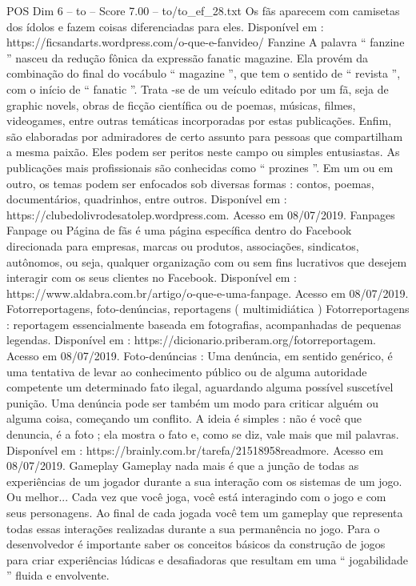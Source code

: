 \begin{textsample}{POS Dim 6 – to – Score 7.00 – to/to\_ef\_28.txt}
Os fãs aparecem com camisetas dos ídolos e fazem coisas diferenciadas para eles.
Disponível em : https://ficsandarts.wordpress.com/o-que-e-fanvideo/ Fanzine A palavra “ fanzine ” nasceu da redução fônica da expressão fanatic magazine.
Ela provém da combinação do final do vocábulo “ magazine ”, que tem o sentido de “ revista ”, com o início de “ fanatic ”.
Trata -se de um veículo editado por um fã, seja de graphic novels, obras de ficção científica ou de poemas, músicas, filmes, videogames, entre outras temáticas incorporadas por estas publicações.
Enfim, são elaboradas por admiradores de certo assunto para pessoas que compartilham a mesma paixão.
Eles podem ser peritos neste campo ou simples entusiastas.
As publicações mais profissionais são conhecidas como “ prozines ”.
Em um ou em outro, os temas podem ser enfocados sob diversas formas : contos, poemas, documentários, quadrinhos, entre outros.
Disponível em : https://clubedolivrodesatolep.wordpress.com.
Acesso em 08/07/2019.
Fanpages Fanpage ou Página de fãs é uma página específica dentro do Facebook direcionada para empresas, marcas ou produtos, associações, sindicatos, autônomos, ou seja, qualquer organização com ou sem fins lucrativos que desejem interagir com os seus clientes no Facebook.
Disponível em : https://www.aldabra.com.br/artigo/o-que-e-uma-fanpage.
Acesso em 08/07/2019.
Fotorreportagens, foto-denúncias, reportagens ( multimidiática ) Fotorreportagens : reportagem essencialmente baseada em fotografias, acompanhadas de pequenas legendas.
Disponível em : https://dicionario.priberam.org/fotorreportagem.
Acesso em 08/07/2019.
Foto-denúncias : Uma denúncia, em sentido genérico, é uma tentativa de levar ao conhecimento público ou de alguma autoridade competente um determinado fato ilegal, aguardando alguma possível suscetível punição.
Uma denúncia pode ser também um modo para criticar alguém ou alguma coisa, começando um conflito.
A ideia é simples : não é você que denuncia, é a foto ; ela mostra o fato e, como se diz, vale mais que mil palavras.
Disponível em : https://brainly.com.br/tarefa/21518958readmore.
Acesso em 08/07/2019.
Gameplay Gameplay nada mais é que a junção de todas as experiências de um jogador durante a sua interação com os sistemas de um jogo.
Ou melhor...
Cada vez que você joga, você está interagindo com o jogo e com seus personagens.
Ao final de cada jogada você tem um gameplay que representa todas essas interações realizadas durante a sua permanência no jogo.
Para o desenvolvedor é importante saber os conceitos básicos da construção de jogos para criar experiências lúdicas e desafiadoras que resultam em uma “ jogabilidade ” fluida e envolvente.

\end{textsample}
